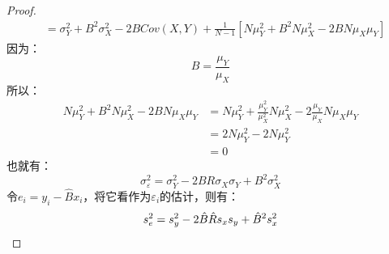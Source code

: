 \begin{proof}
\begin{align*}
		&=\sigma_Y^2+B^2\sigma_X^2-2BCov(X,Y)+\frac{1}{N-1}\left[N\mu_Y^2+B^2N\mu_X^2-2BN\mu_X\mu_Y\right]
	\end{align*}
	因为：
	\begin{equation*}
		B=\frac{\mu_Y}{\mu_X}
	\end{equation*}
	所以：
	\begin{align*}
		N\mu_Y^2+B^2N\mu_X^2-2BN\mu_X\mu_Y
		&=N\mu_Y^2+\frac{\mu_Y^2}{\mu_X^2}N\mu_X^2-2\frac{\mu_Y}{\mu_X}N\mu_X\mu_Y \\
		&=2N\mu_Y^2-2N\mu_Y^2 \\
		&=0
	\end{align*}
	也就有：
	\begin{equation*}
		\sigma_\varepsilon^2=\sigma_Y^2-2BR\sigma_X\sigma_Y+B^2\sigma_X^2
	\end{equation*}
	令$e_i=y_i-\hat{B}x_i$，将它看作为$\varepsilon_i$的估计，则有：
	\begin{equation*}
		s_e^2 =s_y^2-2\hat{B}\hat{R}s_xs_y+\hat{B}^2s_x^2\qedhere
	\end{equation*}
\end{proof}

